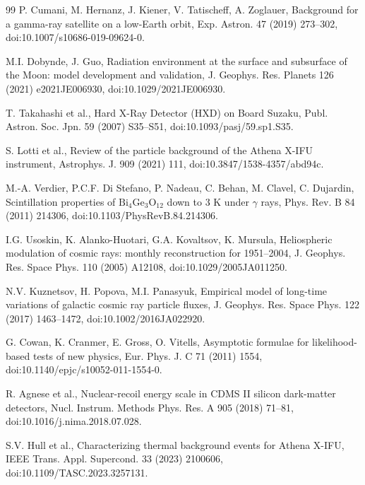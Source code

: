 \documentclass[11pt]{article}
\newcommand{\revblue}[1]{\textcolor{revisionblue}{#1}}
\begin{document}
\begin{thebibliography}{99}
P. Cumani, M. Hernanz, J. Kiener, V. Tatischeff, A. Zoglauer,
Background for a gamma-ray satellite on a low-Earth orbit,
Exp. Astron. 47 (2019) 273--302,
doi:10.1007/s10686-019-09624-0.

M.I. Dobynde, J. Guo,
Radiation environment at the surface and subsurface of the Moon:
model development and validation,
J. Geophys. Res. Planets 126 (2021) e2021JE006930,
doi:10.1029/2021JE006930.

\revblue{T. Takahashi et al., Hard X-Ray Detector (HXD) on Board Suzaku,
Publ. Astron. Soc. Jpn. 59 (2007) S35--S51,
doi:10.1093/pasj/59.sp1.S35.}

S. Lotti et al.,
Review of the particle background of the Athena X-IFU instrument,
Astrophys. J. 909 (2021) 111,
doi:10.3847/1538-4357/abd94c.

\revblue{M.-A. Verdier, P.C.F. Di Stefano, P. Nadeau, C. Behan, M. Clavel, C. Dujardin,
Scintillation properties of $\mathrm{Bi_4Ge_3O_{12}}$ down to 3 K under
$\gamma$ rays,
Phys. Rev. B 84 (2011) 214306,
doi:10.1103/PhysRevB.84.214306.}

I.G. Usoskin, K. Alanko-Huotari, G.A. Kovaltsov, K. Mursula,
Heliospheric modulation of cosmic rays: monthly reconstruction for 1951--2004,
J. Geophys. Res. Space Phys. 110 (2005) A12108,
doi:10.1029/2005JA011250.

N.V. Kuznetsov, H. Popova, M.I. Panasyuk,
Empirical model of long-time variations of galactic cosmic ray particle fluxes,
J. Geophys. Res. Space Phys. 122 (2017) 1463--1472,
doi:10.1002/2016JA022920.

G. Cowan, K. Cranmer, E. Gross, O. Vitells, Asymptotic formulae for likelihood-based tests of new physics, Eur. Phys. J. C 71 (2011) 1554, doi:10.1140/epjc/s10052-011-1554-0.

R. Agnese et al., Nuclear-recoil energy scale in CDMS II silicon dark-matter detectors, Nucl. Instrum. Methods Phys. Res. A 905 (2018) 71--81, doi:10.1016/j.nima.2018.07.028.

S.V. Hull et al., Characterizing thermal background events for Athena X-IFU, IEEE Trans. Appl. Supercond. 33 (2023) 2100606, doi:10.1109/TASC.2023.3257131.

\end{thebibliography}
\end{document}
